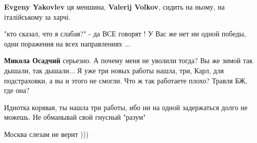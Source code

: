 \begin{itemize}
\begin{itemize}
 
\textbf{Evgeny Yakovlev} ця меншина, \textbf{Valerij Volkov}, сидить на ньому, на італійському за харчі.
\end{itemize}

 
"кто сказал, что я слабая?" - да ВСЕ говорят ! У Вас же нет ни одной победы,
одни поражения на всех направлениях ...

\begin{itemize}
 
\textbf{Микола Осадчий} серьезно. А почему меня не уволили тогда? Вы же зимой так дышали, так дышали... Я уже три новых работы нашла, три, Карл, для подстраховки, а вы и этого не смогли. Что ж так работаете плохо? Травля БЖ, где она?

 
Идиотка корявая, ты нашла три работы, ибо ни на одной задержаться долго не можешь. Не обманывай свой гнусный "разум"
\end{itemize}

 
Москва слезам не верит )))

 

\end{itemize}
